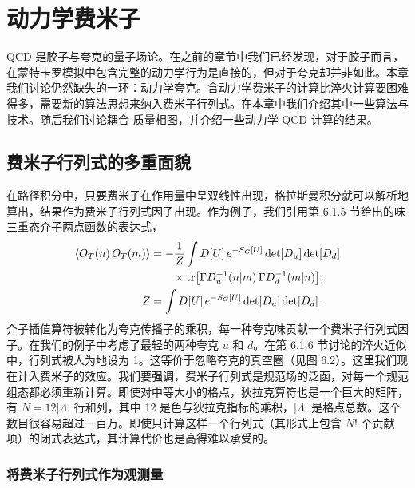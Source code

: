 
\chapter{动力学费米子}

QCD 是胶子与夸克的量子场论。在之前的章节中我们已经发现，对于胶子而言，在蒙特卡罗模拟中包含完整的动力学行为是直接的，但对于夸克却并非如此。本章我们讨论仍然缺失的一环：动力学夸克。含动力学费米子的计算比淬火计算要困难得多，需要新的算法思想来纳入费米子行列式。在本章中我们介绍其中一些算法与技术。随后我们讨论耦合-质量相图，并介绍一些动力学 QCD 计算的结果。

\section{费米子行列式的多重面貌}

在路径积分中，只要费米子在作用量中呈双线性出现，格拉斯曼积分就可以解析地算出，结果作为费米子行列式因子出现。作为例子，我们引用第 6.1.5 节给出的味三重态介子两点函数的表达式，
\begin{equation}
\begin{split}
\left\langle O_T(n)\,O_T(m) \right\rangle &= -\frac{1}{Z}\int D[U]\,e^{-S_G[U]}\det[D_u]\det[D_d]\\
&\qquad\times \operatorname{tr}\!\big[\Gamma D_u^{-1}(n|m)\,\Gamma D_d^{-1}(m|n)\big],\\
Z &= \int D[U]\,e^{-S_G[U]}\det[D_u]\det[D_d].
\end{split}
\end{equation}
介子插值算符被转化为夸克传播子的乘积，每一种夸克味贡献一个费米子行列式因子。在我们的例子中考虑了最轻的两种夸克 $u$ 和 $d$。在第 6.1.6 节讨论的淬火近似中，行列式被人为地设为 1。这等价于忽略夸克的真空圈（见图 6.2）。这里我们现在计入费米子的效应。我们要强调，费米子行列式是规范场的泛函，对每一个规范组态都必须重新计算。即使对中等大小的格点，狄拉克算符也是一个巨大的矩阵，有 $N = 12|\Lambda|$ 行和列，其中 12 是色与狄拉克指标的乘积，$|\Lambda|$ 是格点总数。这个数目很容易超过一百万。即使只计算这样一个行列式（其形式上包含 $N!$ 个贡献项）的闭式表达式，其计算代价也是高得难以承受的。

\subsection{将费米子行列式作为观测量}

